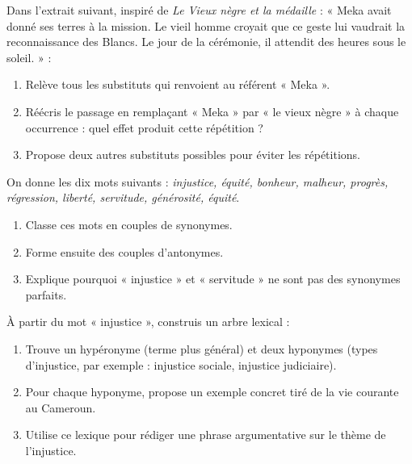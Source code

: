 \documentclass[11pt]{article}
\newcounter{popsec}
\newcounter{popsub}
\newcommand{\courssub}[1]{%
  \stepcounter{popsub}%
  \par\vspace{9pt}\noindent{\popxbold\fontsize{11.5}{13}\selectfont\color{popink}{\color{poporange}\thepopsec.\thepopsub}\hspace{6pt}#1}\par\nopagebreak\vspace{4pt}
}
\begin{document}
\courssub{Je m'entraîne}

\begin{exercice}
Dans l'extrait suivant, inspiré de \emph{Le Vieux nègre et la médaille} : « Meka avait donné ses terres à la mission. Le vieil homme croyait que ce geste lui vaudrait la reconnaissance des Blancs. Le jour de la cérémonie, il attendit des heures sous le soleil. » :
\begin{enumerate}
\item Relève tous les substituts qui renvoient au référent « Meka ».
\item Réécris le passage en remplaçant « Meka » par « le vieux nègre » à chaque occurrence : quel effet produit cette répétition ?
\item Propose deux autres substituts possibles pour éviter les répétitions.
\end{enumerate}
\end{exercice}

\begin{exercice}
On donne les dix mots suivants : \emph{injustice, équité, bonheur, malheur, progrès, régression, liberté, servitude, générosité, équité}.
\begin{enumerate}
\item Classe ces mots en couples de synonymes.
\item Forme ensuite des couples d'antonymes.
\item Explique pourquoi « injustice » et « servitude » ne sont pas des synonymes parfaits.
\end{enumerate}
\end{exercice}

\begin{exercice}
À partir du mot « injustice », construis un arbre lexical :
\begin{enumerate}
\item Trouve un hypéronyme (terme plus général) et deux hyponymes (types d'injustice, par exemple : injustice sociale, injustice judiciaire).
\item Pour chaque hyponyme, propose un exemple concret tiré de la vie courante au Cameroun.
\item Utilise ce lexique pour rédiger une phrase argumentative sur le thème de l'injustice.
\end{enumerate}
\end{exercice}
\end{document}
